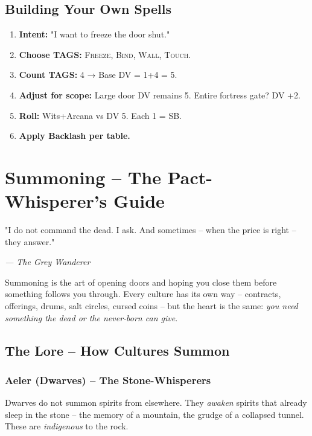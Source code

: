 \documentclass[10pt,a5paper]{book}
\newcommand{\tag}[1]{\textsc{#1}}
\begin{document}
\section{Building Your Own Spells}
\begin{enumerate}
    \item \textbf{Intent:} "I want to freeze the door shut."
    \item \textbf{Choose TAGS:} \tag{Freeze}, \tag{Bind}, \tag{Wall}, \tag{Touch}.
    \item \textbf{Count TAGS:} 4 → Base DV = 1+4 = 5.
    \item \textbf{Adjust for scope:} Large door DV remains 5. Entire fortress gate? DV +2.
    \item \textbf{Roll:} Wits+Arcana vs DV 5. Each 1 = SB.
    \item \textbf{Apply Backlash per table.}
\end{enumerate}

\clearpage


\chapter{Summoning -- The Pact-Whisperer's Guide}
\epigraph{"I do not command the dead. I ask. And sometimes -- when the price is right -- they answer."}{\textit{--- The Grey Wanderer}}

Summoning is the art of opening doors and hoping you close them before something follows you through. Every culture has its own way -- contracts, offerings, drums, salt circles, cursed coins -- but the heart is the same: \textit{you need something the dead or the never‑born can give}.

\section{The Lore -- How Cultures Summon}

\subsection{Aeler (Dwarves) -- The Stone-Whisperers}
Dwarves do not summon spirits from elsewhere. They \textit{awaken} spirits that already sleep in the stone -- the memory of a mountain, the grudge of a collapsed tunnel. These are \textit{indigenous} to the rock.
\end{document}
